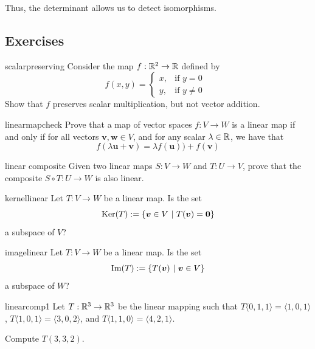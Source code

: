 Thus, the determinant allows us to detect isomorphisms.  







\subsection{Exercises}



\begin{problem}{scalarpreserving}
Consider the map $f: \mathbb{R}^2 \to \mathbb{R}$ defined by $$f(x,y) =
\begin{cases}
x,  & \text{if $y=0$ } \\
y, & \text{if $y\neq 0$ }
\end{cases}$$
Show that $f$ preserves scalar multiplication, but not vector addition.
\end{problem}

\begin{problem}{linearmapcheck}
Prove that a map of vector spaces $f: V \to W$ is a linear map if and only if for all vectors $\bm{v}, \bm{w} \in V$, and for any scalar $\lambda \in \mathbb{R}$, we have that
$$f(\lambda \bm{u} + \bm{v}) = \lambda f(\bm{u}))+ f(\bm{v})$$

\end{problem}

\begin{problem}{linear composite}
Given two linear maps $S: V \to W$ and $T : U \to V$, prove that the composite $S \circ T : U \to W$ is also linear.
\end{problem}

\begin{problem}{kernellinear}
Let $T : V \to W$ be a linear map.  Is the set $$\textnormal{Ker}(T) := \{ \bm{v} \in V \ | \ T(\bm{v}) = \bm{0} \}$$ a subspace of $V$?
\end{problem}

\begin{problem}{imagelinear}
Let $T : V \to W$ be a linear map.  Is the set $$\textnormal{Im}(T) := \{ T(\bm{v}) \ | \ \bm{v} \in V\}$$ a subspace of $W$?
\end{problem}

\begin{problem}{linearcomp1}
    Let $T : \mathbb{R}^3 \to \mathbb{R}^3$ be the linear mapping such that $T\langle0,1,1\rangle = \langle1,0,1\rangle$, $T\langle1,0,1\rangle = \langle3,0,2\rangle$, and $T\langle1,1,0\rangle = \langle4,2,1\rangle$. 
    
    Compute $T(3, 3, 2)$.
\end{problem}

